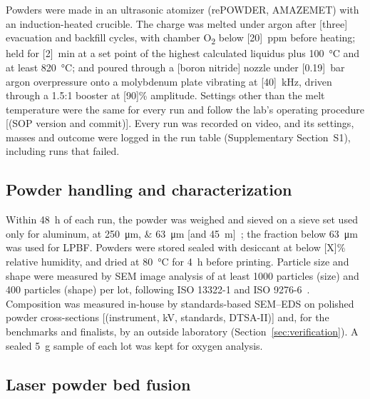 \documentclass[preprint,12pt]{elsarticle}
\newcommand{\placeholder}[1]{\textcolor{red!75!black}{[#1]}}
\begin{document}
Powders were made in an ultrasonic atomizer (rePOWDER, AMAZEMET) with an induction-heated crucible.
The charge was melted under argon after \placeholder{three} evacuation and backfill cycles, with chamber O\textsubscript{2} below \placeholder{20}~ppm before heating; held for \placeholder{2}~min at a set point of the highest calculated liquidus plus \SI{100}{\celsius} and at least \SI{820}{\celsius}; and poured through a \placeholder{boron nitride} nozzle under \placeholder{0.19}~bar argon overpressure onto a molybdenum plate vibrating at \placeholder{40}~kHz, driven through a 1.5:1 booster at \placeholder{90}\% amplitude.
Settings other than the melt temperature were the same for every run and follow the lab's operating procedure \placeholder{(SOP version and commit)}.
Every run was recorded on video, and its settings, masses and outcome were logged in the run table (Supplementary Section~S1), including runs that failed.

\subsection{Powder handling and characterization}

Within \SI{48}{h} of each run, the powder was weighed and sieved on a sieve set used only for aluminum, at \SIlist{250;63}{\micro m} \placeholder{and 45~\textmu m}~\cite{astm_b214}; the fraction below \SI{63}{\micro m} was used for LPBF.
Powders were stored sealed with desiccant at below \placeholder{X}\% relative humidity, and dried at \SI{80}{\celsius} for \SI{4}{h} before printing.
Particle size and shape were measured by SEM image analysis of at least 1000 particles (size) and 400 particles (shape) per lot, following ISO 13322-1 and ISO 9276-6~\cite{iso13322,iso9276}.
Composition was measured in-house by standards-based SEM--EDS on polished powder cross-sections \placeholder{(instrument, kV, standards, DTSA-II)} and, for the benchmarks and finalists, by an outside laboratory (Section~\ref{sec:verification}).
A sealed \SI{5}{g} sample of each lot was kept for oxygen analysis.

\subsection{Laser powder bed fusion}
\label{sec:lpbf}
\end{document}
